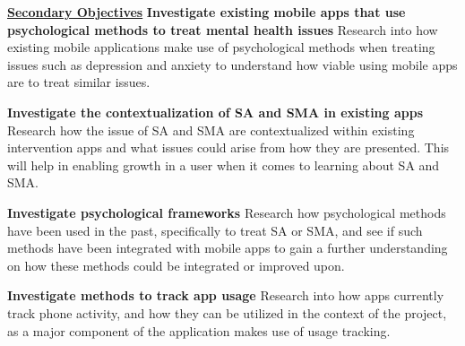 \documentclass[12pt]{article}
\begin{document}
\noindent\underline{\textbf{Secondary Objectives}}\newline\newline
\noindent\textbf{Investigate existing mobile apps that use psychological methods to treat mental health issues}\newline
Research into how existing mobile applications make use of psychological methods when treating issues such as 
depression and anxiety to understand how viable using mobile apps are to treat similar issues.\newline

\noindent\textbf{Investigate the contextualization of SA and SMA in existing apps}\newline
Research how the issue of SA and SMA are contextualized within existing intervention apps and what issues could
arise from how they are presented. This will help in enabling growth in a user when it comes to learning about
SA and SMA.\newline

\noindent\textbf{Investigate psychological frameworks}\newline %
Research how psychological methods have been used in the past, specifically to treat SA or SMA, and see if such 
methods have been integrated with mobile apps to gain a further understanding on how these methods could be 
integrated or improved upon.\newline

\noindent\textbf{Investigate methods to track app usage}\newline
Research into how apps currently track phone activity, and how they can be utilized in the context of the project,
as a major component of the application makes use of usage tracking.\newline


\end{document}
